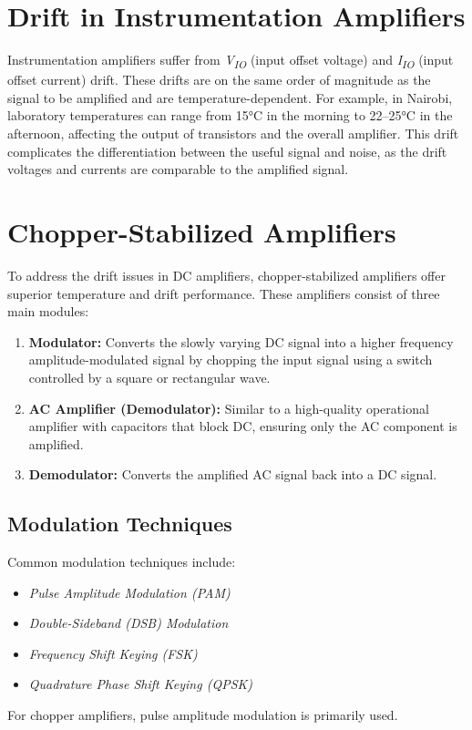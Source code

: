 \section{Drift in Instrumentation Amplifiers}
Instrumentation amplifiers suffer from \textit{V\textsubscript{IO}} (input offset voltage) and \textit{I\textsubscript{IO}} (input offset current) drift. These drifts are on the same order of magnitude as the signal to be amplified and are temperature-dependent. For example, in Nairobi, laboratory temperatures can range from 15°C in the morning to 22–25°C in the afternoon, affecting the output of transistors and the overall amplifier. This drift complicates the differentiation between the useful signal and noise, as the drift voltages and currents are comparable to the amplified signal.

\section{Chopper-Stabilized Amplifiers}
To address the drift issues in DC amplifiers, chopper-stabilized amplifiers offer superior temperature and drift performance. These amplifiers consist of three main modules:
\begin{enumerate}
    \item \textbf{Modulator:} Converts the slowly varying DC signal into a higher frequency amplitude-modulated signal by chopping the input signal using a switch controlled by a square or rectangular wave.
    \item \textbf{AC Amplifier (Demodulator):} Similar to a high-quality operational amplifier with capacitors that block DC, ensuring only the AC component is amplified.
    \item \textbf{Demodulator:} Converts the amplified AC signal back into a DC signal.
\end{enumerate}

\subsection{Modulation Techniques}
Common modulation techniques include:
\begin{itemize}
    \item \textit{Pulse Amplitude Modulation (PAM)}
    \item \textit{Double-Sideband (DSB) Modulation}
    \item \textit{Frequency Shift Keying (FSK)}
    \item \textit{Quadrature Phase Shift Keying (QPSK)}
\end{itemize}
For chopper amplifiers, pulse amplitude modulation is primarily used.

